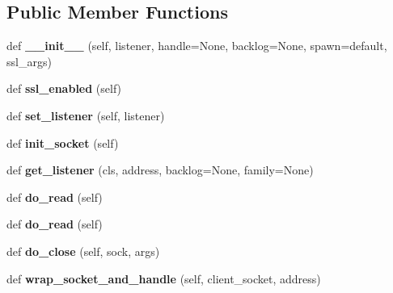 \subsection*{Public Member Functions}
\begin{DoxyCompactItemize}
\item 
\mbox{\label{classgevent_1_1server_1_1_stream_server_a1b2498e473aefcd23b390ddfec506116}} 
def {\bfseries \+\_\+\+\_\+init\+\_\+\+\_\+} (self, listener, handle=None, backlog=None, spawn=\textquotesingle{}default\textquotesingle{}, ssl\+\_\+args)
\item 
\mbox{\label{classgevent_1_1server_1_1_stream_server_acc0947d8677cd58450bea1031c65d45b}} 
def {\bfseries ssl\+\_\+enabled} (self)
\item 
\mbox{\label{classgevent_1_1server_1_1_stream_server_aff72d8d14ae745756e1a251b25d62392}} 
def {\bfseries set\+\_\+listener} (self, listener)
\item 
\mbox{\label{classgevent_1_1server_1_1_stream_server_af37c1a1c5da8d9d0fab2748d95efa13f}} 
def {\bfseries init\+\_\+socket} (self)
\item 
\mbox{\label{classgevent_1_1server_1_1_stream_server_a58d410a46b429a507913cc57b1b9c135}} 
def {\bfseries get\+\_\+listener} (cls, address, backlog=None, family=None)
\item 
\mbox{\label{classgevent_1_1server_1_1_stream_server_a32a11c6e41250dc69bf89120db2f6b28}} 
def {\bfseries do\+\_\+read} (self)
\item 
\mbox{\label{classgevent_1_1server_1_1_stream_server_a32a11c6e41250dc69bf89120db2f6b28}} 
def {\bfseries do\+\_\+read} (self)
\item 
\mbox{\label{classgevent_1_1server_1_1_stream_server_ad33c9ebeff8c8746da0d3769bcfe3b61}} 
def {\bfseries do\+\_\+close} (self, sock, args)
\item 
\mbox{\label{classgevent_1_1server_1_1_stream_server_a68687c2ad92f35186a0491d9743f8e51}} 
def {\bfseries wrap\+\_\+socket\+\_\+and\+\_\+handle} (self, client\+\_\+socket, address)
\end{DoxyCompactItemize}
